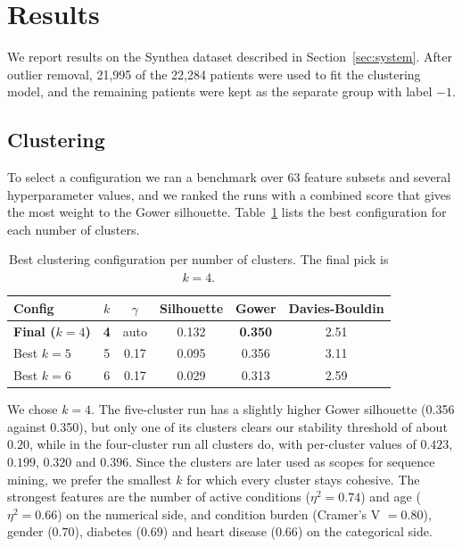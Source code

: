
\section{Results}
\label{sec:results}

We report results on the Synthea dataset described in Section~\ref{sec:system}. After outlier removal, 21{,}995 of the 22{,}284 patients were used to fit the clustering model, and the remaining patients were kept as the separate group with label $-1$.

\subsection{Clustering}

To select a configuration we ran a benchmark over 63 feature subsets and several hyperparameter values, and we ranked the runs with a combined score that gives the most weight to the Gower silhouette. Table~\ref{tab:clusters} lists the best configuration for each number of clusters.

\begin{table}[t]
\caption{Best clustering configuration per number of clusters. The final pick is $k=4$.}
\label{tab:clusters}
\centering
\small
\begin{tabular}{@{}lccccc@{}}
\toprule
Config & $k$ & $\gamma$ & Silhouette & Gower & Davies-Bouldin \\
\midrule
\textbf{Final ($k{=}4$)} & \textbf{4} & auto & 0.132 & \textbf{0.350} & 2.51 \\
Best $k{=}5$ & 5 & 0.17 & 0.095 & 0.356 & 3.11 \\
Best $k{=}6$ & 6 & 0.17 & 0.029 & 0.313 & 2.59 \\
\bottomrule
\end{tabular}
\end{table}

We chose $k=4$. The five-cluster run has a slightly higher Gower silhouette (0.356 against 0.350), but only one of its clusters clears our stability threshold of about $0.20$, while in the four-cluster run all clusters do, with per-cluster values of $0.423$, $0.199$, $0.320$ and $0.396$. Since the clusters are later used as scopes for sequence mining, we prefer the smallest $k$ for which every cluster stays cohesive. The strongest features are the number of active conditions ($\eta^2 = 0.74$) and age ($\eta^2 = 0.66$) on the numerical side, and condition burden (Cramer's V $= 0.80$), gender ($0.70$), diabetes ($0.69$) and heart disease ($0.66$) on the categorical side.

